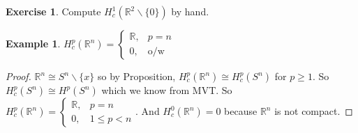 \documentclass[10pt]{article}
\theoremstyle{plain}
\theoremstyle{definition}
\newtheorem{exmp}[thm]{Example} %
\newtheorem{exercise}[thm]{Exercise}
\newcommand{\Real}{\mathbb{R}}
\begin{document}
\begin{exercise}
Compute $H^1_c(\Real^2 \backslash \{0\})$ by hand.
\end{exercise}
\begin{exmp}
$H_c^p(\Real^n) = \begin{cases} \Real, & p = n \\ 0 ,& \text{o/w} \end{cases}$
\end{exmp}
\begin{proof}
$\Real^n \cong S^n \backslash \{x\}$ so by Proposition, $H^p_c(\Real^n) \cong H^p_c(S^n)$ for $p\geq 1$. So $H^p_c(S^n) \cong H^p(S^n)$ which we know from MVT. So $H^p_c(\Real^n) = \begin{cases} \Real, & p = n \\ 0 ,& 1\leq p < n \end{cases}$. And $H^0_c(\Real^n) = 0$ because $\Real^n$ is not compact.
\end{proof}
\end{document}
